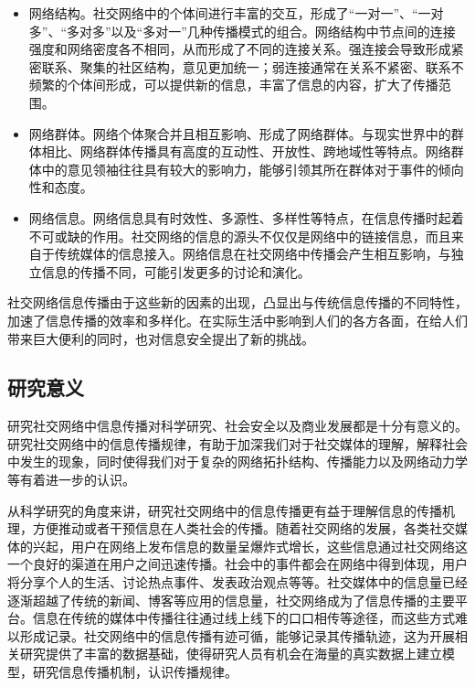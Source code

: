 \begin{itemize}
	\item 网络结构。社交网络中的个体间进行丰富的交互，形成了“一对一”、“一对多”、“多对多”以及“多对一”几种传播模式的组合。网络结构中节点间的连接强度和网络密度各不相同，从而形成了不同的连接关系。强连接会导致形成紧密联系、聚集的社区结构，意见更加统一；弱连接通常在关系不紧密、联系不频繁的个体间形成，可以提供新的信息，丰富了信息的内容，扩大了传播范围。
	\item 网络群体。网络个体聚合并且相互影响、形成了网络群体。与现实世界中的群体相比、网络群体传播具有高度的互动性、开放性、跨地域性等特点。网络群体中的意见领袖往往具有较大的影响力，能够引领其所在群体对于事件的倾向性和态度。
	\item 网络信息。网络信息具有时效性、多源性、多样性等特点，在信息传播时起着不可或缺的作用。社交网络的信息的源头不仅仅是网络中的链接信息，而且来自于传统媒体的信息接入。网络信息在社交网络中传播会产生相互影响，与独立信息的传播不同，可能引发更多的讨论和演化。
\end{itemize}

社交网络信息传播由于这些新的因素的出现，凸显出与传统信息传播的不同特性，加速了信息传播的效率和多样化。在实际生活中影响到人们的各方各面，在给人们带来巨大便利的同时，也对信息安全提出了新的挑战。
\subsection{研究意义}
\label{subsec1:researchSignificance}
研究社交网络中信息传播对科学研究、社会安全以及商业发展都是十分有意义的。研究社交网络中的信息传播规律，有助于加深我们对于社交媒体的理解，解释社会中发生的现象，同时使得我们对于复杂的网络拓扑结构、传播能力以及网络动力学等有着进一步的认识。

从科学研究的角度来讲，研究社交网络中的信息传播更有益于理解信息的传播机理，方便推动或者干预信息在人类社会的传播。随着社交网络的发展，各类社交媒体的兴起，用户在网络上发布信息的数量呈爆炸式增长，这些信息通过社交网络这一个良好的渠道在用户之间迅速传播。社会中的事件都会在网络中得到体现，用户将分享个人的生活、讨论热点事件、发表政治观点等等。社交媒体中的信息量已经逐渐超越了传统的新闻、博客等应用的信息量，社交网络成为了信息传播的主要平台。信息在传统的媒体中传播往往通过线上线下的口口相传等途径，而这些方式难以形成记录。社交网络中的信息传播有迹可循，能够记录其传播轨迹，这为开展相关研究提供了丰富的数据基础，使得研究人员有机会在海量的真实数据上建立模型，研究信息传播机制，认识传播规律。

